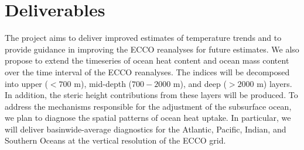 \documentclass[authoryear,round,12pt]{article}
\begin{document}

\section{Deliverables}
\label{sec:deliverables}

The project aims to deliver improved estimates of temperature trends and to provide guidance in improving the ECCO reanalyses for future estimates. We also propose to extend the timeseries of ocean heat content and ocean mass content over the time interval of the ECCO reanalyses. 
The indices will be decomposed into upper ($<700$ m), mid-depth ($700-2000$ m), and deep ($>2000$ m) layers. In addition, the steric height contributions from these layers will be produced.
To address the mechanisms responsible for the adjustment of the subsurface ocean, we plan to diagnose the spatial patterns of ocean heat uptake. In particular, we will deliver basinwide-average diagnostics for the Atlantic, Pacific, Indian, and Southern Oceans at the vertical resolution of the ECCO grid. 
\end{document}
